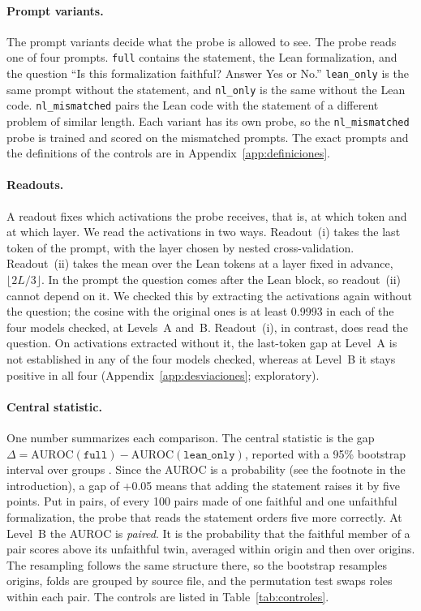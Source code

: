 \documentclass[10pt]{article}
\newcommand{\vr}[1]{\texttt{#1}}
\newcommand{\D}{\Delta}
\begin{document}
\paragraph{Prompt variants.}
The prompt variants decide what the probe is allowed to see.
The probe reads one of four prompts. \vr{full} contains the statement, the Lean formalization, and the question
``Is this formalization faithful? Answer Yes or No.'' \vr{lean\_only} is the same prompt without the statement, and \vr{nl\_only} is
the same without the Lean code. \vr{nl\_mismatched} pairs the Lean code with the statement of a different problem of similar
length.
Each variant has its own probe, so the \vr{nl\_mismatched} probe is trained and scored on the mismatched prompts.
The exact prompts and the definitions of the controls are in Appendix~\ref{app:definiciones}.

\paragraph{Readouts.}
A readout fixes which activations the probe receives, that is, at which token and at which layer.
We read the activations in two ways. Readout~(i) takes the last token of the prompt, with the layer chosen by
nested cross-validation. Readout~(ii) takes the mean over the Lean tokens at a layer fixed in advance,
$\lfloor 2L/3 \rfloor$.
In the prompt the question comes after the Lean block, so readout~(ii) cannot depend on it. We checked this by
extracting the activations again without the question; the cosine with the original ones is at least 0.9993 in each of the four models checked, at Levels~A and~B.
Readout~(i), in contrast, does read the question. On activations extracted without it, the last-token gap at Level~A
is not established in any of the four models checked, whereas at Level~B it stays positive in all four
(Appendix~\ref{app:desviaciones}; exploratory).

\paragraph{Central statistic.}
One number summarizes each comparison.
The central statistic is the gap
$\D = \mathrm{AUROC}(\vr{full}) - \mathrm{AUROC}(\vr{lean\_only})$, reported with a 95\% bootstrap interval over groups \citep{efron}.
Since the AUROC is a probability (see the footnote in the introduction), a gap of +0.05 means that adding the
statement raises it by five points. Put in pairs, of every 100 pairs made of one faithful and one unfaithful
formalization, the probe that reads the statement orders five more correctly.
At Level~B the AUROC is \emph{paired}. It is the probability that the faithful member of a pair scores above its
unfaithful twin, averaged within origin and then over origins. The resampling follows the same structure there, so
the bootstrap resamples origins, folds are grouped by source file, and the permutation test swaps roles within each
pair.
The controls are listed in Table~\ref{tab:controles}.
\end{document}
